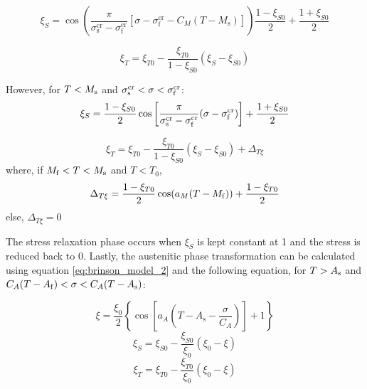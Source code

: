 \begin{equation}
  \label{eq:brinson_conv_xis}
  \xi_S = \cos\left(\frac{\pi}{\sigma_\mathrm{s}^\mathrm{cr}-\sigma_\mathrm{f}^\mathrm{cr}}[\sigma - \sigma_\mathrm{f}^\mathrm{cr} - C_M(T-M_\mathrm{s})]\right)\frac{1-\xi_{S0}}{2} + \frac{1+\xi_{S0}}{2}
\end{equation}

\begin{equation}
  \label{eq:brinson_conv_xit}
  \xi_T = \xi_{T0} - \frac{\xi_{T0}}{1-\xi_{S0}}(\xi_S-\xi_{S0})
\end{equation}

However, for $T<M_\mathrm{s}$ and $\sigma_\mathrm{s}^\mathrm{cr}<\sigma<\sigma_\mathrm{f}^\mathrm{cr}$:
\begin{equation}
  \label{eq:brinson_conv_xis1}
  \xi_S = \frac{1-\xi_{S0}}{2}\cos\left[\frac{\pi}{\sigma_\mathrm{s}^\mathrm{cr}-\sigma_\mathrm{f}^\mathrm{cr}}(\sigma - \sigma_\mathrm{f}^\mathrm{cr})\right] + \frac{1+\xi_{S0}}{2}
\end{equation}

\begin{equation}
  \label{eq:brinson_conv_xit2}
  \xi_T = \xi_{T0} - \frac{\xi_{T0}}{1-\xi_{S0}}(\xi_S-\xi_{S0})+\Delta_{T\xi}
\end{equation}
where, if $M_\mathrm{f}<T<M_\mathrm{s}$ and $T<T_0$,
\begin{equation}
  \label{eq:deltaTxi}
  \Delta_{T\xi} = \frac{1-\xi_{T0}}{2}\cos(a_M(T-M_\mathrm{f}))+\frac{1-\xi_{T0}}{2}
\end{equation}
else, $\Delta_{T\xi}=0$

The stress relaxation phase occurs when $\xi_S$ is kept constant at 1 and the stress is reduced back to 0. Lastly, the austenitic phase transformation can be calculated using equation \ref{eq:brinson_model_2} and the following equation, for $T>A_\mathrm{s}$ and $C_A(T-A_\mathrm{f})<\sigma<C_A(T-A_\mathrm{s})$:

\begin{equation}
  \label{eq:A_transf}
  \xi = \frac{\xi_0}{2}\left\{\cos\left[a_A\left(T-A_\mathrm{s}-\frac{\sigma}{C_A}\right)\right]+1\right\}
\end{equation}
\begin{equation}
    \label{eq:a-transf_1}
    \xi_S = \xi_{S0} - \frac{\xi_{S0}}{\xi_0}(\xi_0-\xi)
\end{equation}
\begin{equation}
    \label{eq:a-transf_2}
    \xi_T = \xi_{T0} - \frac{\xi_{T0}}{\xi_0}(\xi_0-\xi)
\end{equation}

